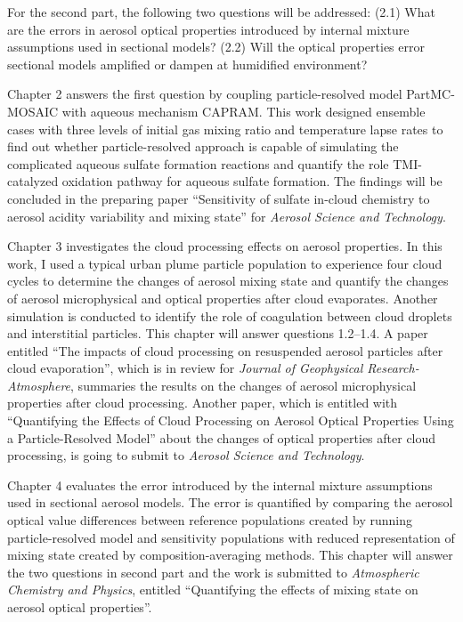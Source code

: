 \documentclass[edeposit,fullpage]{uiucthesis2009}
\begin{document}
For the second part, the following two questions will be addressed: (2.1) What are the errors in aerosol optical properties introduced by internal mixture assumptions used in sectional models? (2.2) Will the optical properties error sectional models amplified or dampen at humidified environment? 

Chapter 2 answers the first question by coupling particle-resolved model PartMC-MOSAIC with aqueous mechanism CAPRAM. This work designed ensemble cases with three levels of initial gas mixing ratio and temperature lapse rates to find out whether particle-resolved approach is capable of simulating the complicated aqueous sulfate formation reactions and quantify the role TMI-catalyzed oxidation pathway for aqueous sulfate formation. The findings will be concluded in the preparing paper ``Sensitivity of sulfate in-cloud chemistry to aerosol acidity variability and mixing state'' for \textit{Aerosol Science and Technology}. 

Chapter 3 investigates the cloud processing effects on aerosol properties. In this work, I used a typical urban plume particle population to experience four cloud cycles to determine the changes of aerosol mixing state and quantify the changes of aerosol microphysical and optical properties after cloud evaporates. Another simulation is conducted to identify the role of coagulation between cloud droplets and interstitial particles. This chapter will answer questions 1.2--1.4. A paper entitled ``The impacts of cloud processing on resuspended aerosol particles after cloud evaporation'', which is in review for \textit{Journal of Geophysical Research-Atmosphere}, summaries the results on the changes of aerosol microphysical properties after cloud processing. Another paper, which is entitled with ``Quantifying the Effects of Cloud Processing on Aerosol Optical Properties Using a Particle-Resolved Model'' about the changes of optical properties after cloud processing, is going to submit to \textit{Aerosol Science and Technology}. 

Chapter 4 evaluates the error introduced by the internal mixture assumptions used in sectional aerosol models. The error is quantified by comparing the aerosol optical value differences between reference populations created by running particle-resolved model and sensitivity populations with reduced representation of mixing state created by composition-averaging methods. This chapter will answer the two questions in second part and the work is submitted to \textit{Atmospheric Chemistry and Physics}, entitled ``Quantifying the effects of mixing state on aerosol optical properties''.
\end{document}
